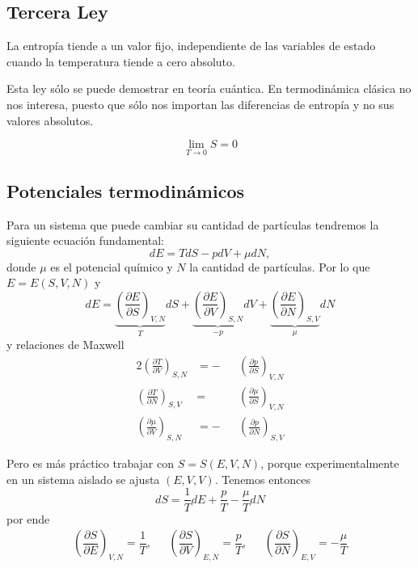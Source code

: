 \documentclass[]{article}
\numberwithin{equation}{section}
\newcommand{\deriv}[3]{\left(\frac{\partial #1}{\partial #2} \right)_{#3}}
\newcommand{\dderiv}[3]{\left(\dfrac{\partial #1}{\partial #2} \right)_{#3}}
\newcommand{\0}{\textcolor{gray}{0}}
\begin{document}
\subsection{Tercera Ley}
La entropía tiende a un valor fijo, independiente de las variables de estado cuando la temperatura tiende a cero absoluto.

Esta ley sólo se puede demostrar en teoría cuántica. En termodinámica clásica no nos interesa, puesto que sólo nos importan las diferencias de entropía y no sus valores absolutos.

\begin{equation}
	\lim_{T\rightarrow0}S = 0
\end{equation}

\subsection{Potenciales termodinámicos}
Para un sistema que puede cambiar su cantidad de partículas tendremos la siguiente ecuación fundamental:
\begin{equation}
	dE = TdS - pdV + \mu dN,
\end{equation}
donde $\mu$ es el potencial químico y $N$ la cantidad de partículas. Por lo que $E = E(S,V,N)$ y
\begin{equation}
	dE =  \underbrace{\left(\frac{\partial E}{\partial S}\right)_{V,N}}_{T}dS + \underbrace{\left(\frac{\partial E}{\partial V}\right)_{S,N}}_{-p}dV + \underbrace{\left(\frac{\partial E}{\partial N}\right)_{S,V}}_{\mu}dN
\end{equation}
y relaciones de Maxwell
\begin{alignat}{2}
	\deriv{T}{V}{S,N}   &= - &&\deriv{p  }{S}{V,N}\\
	\deriv{T}{N}{S,V}   &= \ &&\deriv{\mu}{S}{V,N}\\
	\deriv{\mu}{V}{S,N} &= - &&\deriv{p  }{N}{S,V}
\end{alignat}

Pero es más práctico trabajar con $S=S(E,V,N)$, porque experimentalmente en un sistema aislado se ajusta $(E,V,V)$. Tenemos entonces
\begin{equation}
	dS = \frac{1}{T}dE + \frac{p}{T} - \frac{\mu}{T}dN
\end{equation}
por ende
\begin{equation}
	\begin{matrix}
		\dderiv{S}{E}{V,N} =  \dfrac{1}{T},\ \ \ & \dderiv{S}{V}{E,N} =  \dfrac{p}{T},\ \ \ & \dderiv{S}{N}{E,V} = -\dfrac{\mu}{T}
	\end{matrix}
\end{equation}
\end{document}
